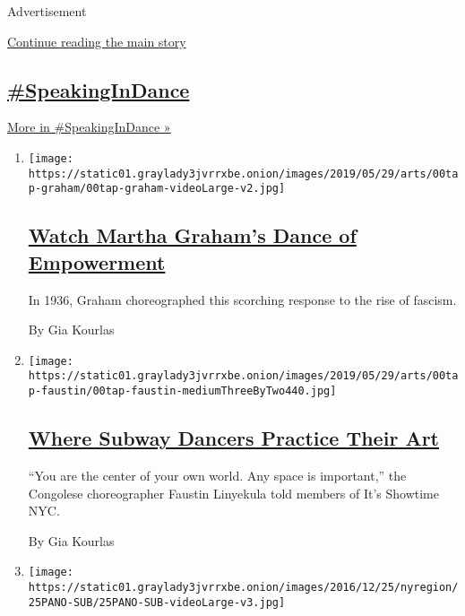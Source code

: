 Advertisement

\protect\hyperlink{after-mid1}{Continue reading the main story}

\hypertarget{speakingindance-1}{%
\subsection{\texorpdfstring{\href{/column/speakingindance}{\#SpeakingInDance}}{\#SpeakingInDance}}\label{speakingindance-1}}

\href{/column/speakingindance}{More in \#SpeakingInDance »}

\begin{enumerate}
\def\labelenumi{\arabic{enumi}.}
\item
  \texttt{[image: https://static01.graylady3jvrrxbe.onion/images/2019/05/29/arts/00tap-graham/00tap-graham-videoLarge-v2.jpg]}

  \hypertarget{watch-martha-grahams-dance-of-empowerment}{%
  \subsection{\texorpdfstring{\href{/interactive/2019/05/30/arts/dance/speaking-in-dance-martha-graham.html}{Watch
  Martha Graham's Dance of
  Empowerment}}{Watch Martha Graham's Dance of Empowerment}}\label{watch-martha-grahams-dance-of-empowerment}}

  In 1936, Graham choreographed this scorching response to the rise of
  fascism.

  By Gia Kourlas
\item
  \texttt{[image: https://static01.graylady3jvrrxbe.onion/images/2019/05/29/arts/00tap-faustin/00tap-faustin-mediumThreeByTwo440.jpg]}

  \hypertarget{where-subway-dancers-practice-their-art}{%
  \subsection{\texorpdfstring{\href{/interactive/2019/05/30/arts/dance/speaking-in-dance-showtime-faustin.html}{Where
  Subway Dancers Practice Their
  Art}}{Where Subway Dancers Practice Their Art}}\label{where-subway-dancers-practice-their-art}}

  ``You are the center of your own world. Any space is important,'' the
  Congolese choreographer Faustin Linyekula told members of It's
  Showtime NYC.

  By Gia Kourlas
\item
  \texttt{[image: https://static01.graylady3jvrrxbe.onion/images/2016/12/25/nyregion/25PANO-SUB/25PANO-SUB-videoLarge-v3.jpg]}


\end{enumerate}
